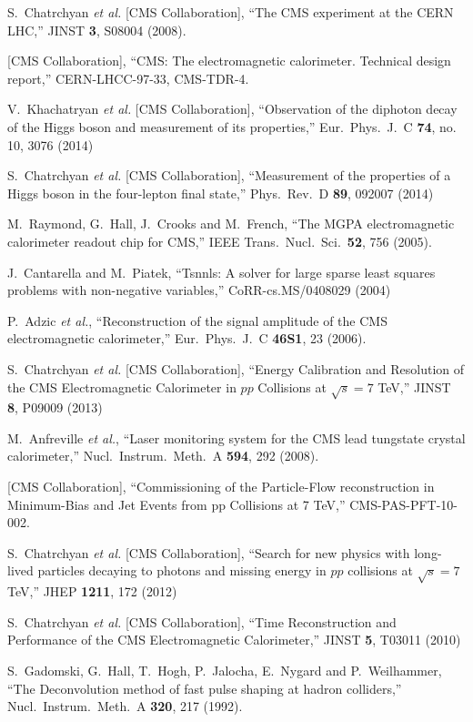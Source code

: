\documentclass[journal]{IEEEtran}
\begin{document}
\begin{thebibliography}{1}

  S.~Chatrchyan {\it et al.}  [CMS Collaboration], ``The CMS experiment at the CERN LHC,'' JINST {\bf 3}, S08004 (2008).

  [CMS Collaboration], ``CMS: The electromagnetic calorimeter. Technical design report,''  CERN-LHCC-97-33, CMS-TDR-4.

  V.~Khachatryan {\it et al.}  [CMS Collaboration], ``Observation of the diphoton decay of the Higgs boson and measurement of its properties,''  Eur.\ Phys.\ J.\ C {\bf 74}, no. 10, 3076 (2014)

  S.~Chatrchyan {\it et al.}  [CMS Collaboration], ``Measurement of the properties of a Higgs boson in the four-lepton final state,''
  Phys.\ Rev.\ D {\bf 89}, 092007 (2014)

  M.~Raymond, G.~Hall, J.~Crooks and M.~French, ``The MGPA electromagnetic calorimeter readout chip for CMS,''
  IEEE Trans.\ Nucl.\ Sci.\  {\bf 52}, 756 (2005).

J.~Cantarella and M.~Piatek, ``Tsnnls: A solver for large sparse least squares problems with non-negative variables,'' CoRR-cs.MS/0408029 (2004)

  P.~Adzic {\it et al.}, ``Reconstruction of the signal amplitude of the CMS electromagnetic calorimeter,''  Eur.\ Phys.\ J.\ C {\bf 46S1}, 23 (2006).

  S.~Chatrchyan {\it et al.}  [CMS Collaboration], ``Energy Calibration and Resolution of the CMS Electromagnetic Calorimeter in $pp$ Collisions at $\sqrt{s} = 7$ TeV,''   JINST {\bf 8}, P09009 (2013)

  M.~Anfreville {\it et al.}, ``Laser monitoring system for the CMS lead tungstate crystal calorimeter,''  Nucl.\ Instrum.\ Meth.\ A {\bf 594}, 292 (2008).

  [CMS Collaboration], ``Commissioning of the Particle-Flow reconstruction in Minimum-Bias and Jet Events from pp Collisions at 7 TeV,''  CMS-PAS-PFT-10-002.

  S.~Chatrchyan {\it et al.}  [CMS Collaboration], ``Search for new physics with long-lived particles decaying to photons and missing energy in $pp$ collisions at $\sqrt{s}=7$ TeV,''  JHEP {\bf 1211}, 172 (2012)

  S.~Chatrchyan {\it et al.}  [CMS Collaboration], ``Time Reconstruction and Performance of the CMS Electromagnetic Calorimeter,''  JINST {\bf 5}, T03011 (2010)

  S.~Gadomski, G.~Hall, T.~Hogh, P.~Jalocha, E.~Nygard and P.~Weilhammer, ``The Deconvolution method of fast pulse shaping at hadron colliders,''  Nucl.\ Instrum.\ Meth.\ A {\bf 320}, 217 (1992).

\end{thebibliography}


\end{document}
